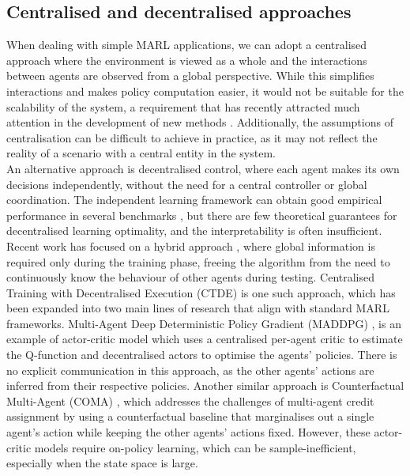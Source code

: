 \documentclass[a4paper,singleside,12pt]{report} %
\begin{document}
\subsection{Centralised and decentralised approaches}\label{cendecenctde}
When dealing with simple MARL applications, we can adopt a centralised approach where the environment is viewed as a whole and the interactions between agents are observed from a global perspective. While this simplifies interactions and makes policy computation easier, it would not be suitable for the scalability of the system, a requirement that has recently attracted much attention in the development of new methods \cite{Gronauer2021MultiagentDR, HernandezLeal2019ASA, Stone2022ASO}. Additionally, the assumptions of centralisation can be difficult to achieve in practice, as it may not reflect the reality of a scenario with a central entity in the system.\\
An alternative approach is decentralised control, where each agent makes its own decisions independently, without the need for a central controller or global coordination. The independent learning framework can obtain good empirical performance in several benchmarks \cite{Papoudakis2020BenchmarkingMD}, but there are few theoretical guarantees for decentralised learning optimality, and the interpretability is often insufficient.
Recent work has focused on a hybrid approach \cite{Lowe2017MultiAgentAF, Foerster2017CounterfactualMP, AAMAS2018VDN, Rashid2018QMIXMV}, where global information is required only during the training phase, freeing the algorithm from the need to continuously know the behaviour of other agents during testing. Centralised Training with Decentralised Execution (CTDE) is one such approach, which has been expanded into two main lines of research that align with standard MARL frameworks. Multi-Agent Deep Deterministic Policy Gradient (MADDPG) \cite{Lowe2017MultiAgentAF}, is an example of actor-critic model which uses a centralised per-agent critic to estimate the Q-function and decentralised actors to optimise the agents' policies. There is no explicit communication in this approach, as the other agents' actions are inferred from their respective policies. Another similar approach is Counterfactual Multi-Agent (COMA) \cite{Foerster2017CounterfactualMP}, which addresses the challenges of multi-agent credit assignment by using a counterfactual baseline that marginalises out a single agent's action while keeping the other agents' actions fixed. However, these actor-critic models require on-policy learning, which can be sample-inefficient, especially when the state space is large.\\
\end{document}
